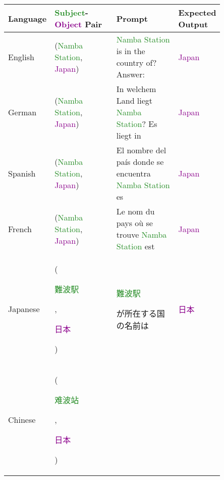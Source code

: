 \begin{table*}[htbp]
\scriptsize
\centering
\setlength{\tabcolsep}{1.0mm}{}
\begin{center}
\begin{tabular}{m{0.10\linewidth} p{0.30\linewidth} p{0.30\linewidth} m{0.15\linewidth}}
\textbf{Language} & \textbf{\textcolor{forestgreen}{Subject}-\textcolor{darkmagenta}{Object} Pair} & \textbf{Prompt} & \textbf{Expected Output} \\
\toprule
{\centering English} 
    & {\raggedright (\textcolor{forestgreen}{Namba Station}, \textcolor{darkmagenta}{Japan})}
    & \textcolor{forestgreen}{Namba Station} is in the country of? \newline Answer:
    & {\centering \textcolor{darkmagenta}{Japan}} \\
\midrule
{\centering German} 
    & {\raggedright (\textcolor{forestgreen}{Namba Station}, \textcolor{darkmagenta}{Japan})}
    & In welchem Land liegt \textcolor{forestgreen}{Namba Station}? Es liegt in
    & {\centering \textcolor{darkmagenta}{Japan}} \\
\midrule
{\centering Spanish} 
    & {\raggedright (\textcolor{forestgreen}{Namba Station}, \textcolor{darkmagenta}{Japan})}
    & El nombre del país donde se encuentra \textcolor{forestgreen}{Namba Station} es
    & {\centering \textcolor{darkmagenta}{Japan}} \\
\midrule
{\centering French} 
    & {\raggedright (\textcolor{forestgreen}{Namba Station}, \textcolor{darkmagenta}{Japan})}
    & Le nom du pays où se trouve \textcolor{forestgreen}{Namba Station} est
    & {\centering \textcolor{darkmagenta}{Japan}} \\
\midrule
{\centering Japanese} 
    & {\raggedright (\textcolor{forestgreen}{\begin{CJK}{UTF8}{min}難波駅\end{CJK}}, \textcolor{darkmagenta}{\begin{CJK}{UTF8}{min}日本\end{CJK}})}
    & \textcolor{forestgreen}{\begin{CJK}{UTF8}{min}難波駅\end{CJK}}\begin{CJK}{UTF8}{min}が所在する国の名前は\end{CJK}
    & {\centering \textcolor{darkmagenta}{\begin{CJK}{UTF8}{min}日本\end{CJK}}} \\
\midrule
{\centering Chinese} 
    & {\raggedright (\textcolor{forestgreen}{\begin{CJK}{UTF8}{gbsn}难波站\end{CJK}}, \textcolor{darkmagenta}{\begin{CJK}{UTF8}{gbsn}日本\end{CJK}})}

\end{tabular}
\end{center}
\end{table*}
